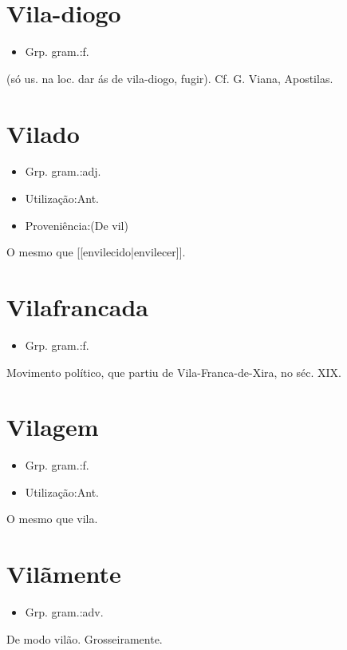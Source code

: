 \documentclass{article}
\begin{document}
\section{Vila-diogo}
\begin{itemize}
\item {Grp. gram.:f.}
\end{itemize}
(só us. na loc. \textunderscore dar ás de vila-diogo\textunderscore , fugir). Cf. G. Viana, \textunderscore Apostilas\textunderscore .
\section{Vilado}
\begin{itemize}
\item {Grp. gram.:adj.}
\end{itemize}
\begin{itemize}
\item {Utilização:Ant.}
\end{itemize}
\begin{itemize}
\item {Proveniência:(De \textunderscore vil\textunderscore )}
\end{itemize}
O mesmo que [[envilecido|envilecer]].
\section{Vilafrancada}
\begin{itemize}
\item {Grp. gram.:f.}
\end{itemize}
Movimento político, que partiu de Vila-Franca-de-Xira, no séc. XIX.
\section{Vilagem}
\begin{itemize}
\item {Grp. gram.:f.}
\end{itemize}
\begin{itemize}
\item {Utilização:Ant.}
\end{itemize}
O mesmo que \textunderscore vila\textunderscore .
\section{Vilãmente}
\begin{itemize}
\item {Grp. gram.:adv.}
\end{itemize}
De modo vilão.
Grosseiramente.
\end{document}
